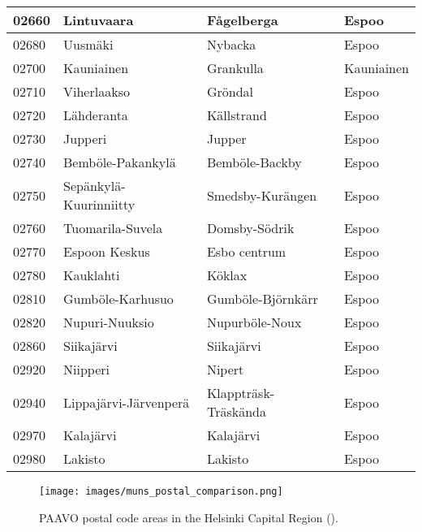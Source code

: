 \begin{longtable}{llll}
    02660 & Lintuvaara & Fågelberga & Espoo \\ [0.25ex] \hline
    02680 & Uusmäki & Nybacka & Espoo \\ [0.25ex] \hline
    02700 & Kauniainen & Grankulla & Kauniainen \\ [0.25ex] \hline
    02710 & Viherlaakso & Gröndal & Espoo \\ [0.25ex] \hline
    02720 & Lähderanta & Källstrand & Espoo \\ [0.25ex] \hline
    02730 & Jupperi & Jupper & Espoo \\ [0.25ex] \hline
    02740 & Bemböle-Pakankylä & Bemböle-Backby & Espoo \\ [0.25ex] \hline
    02750 & Sepänkylä-Kuurinniitty & Smedsby-Kurängen & Espoo \\ [0.25ex] \hline
    02760 & Tuomarila-Suvela & Domsby-Södrik & Espoo \\ [0.25ex] \hline
    02770 & Espoon Keskus & Esbo centrum & Espoo \\ [0.25ex] \hline
    02780 & Kauklahti & Köklax & Espoo \\ [0.25ex] \hline
    02810 & Gumböle-Karhusuo & Gumböle-Björnkärr & Espoo \\ [0.25ex] \hline
    02820 & Nupuri-Nuuksio & Nupurböle-Noux & Espoo \\ [0.25ex] \hline
    02860 & Siikajärvi & Siikajärvi & Espoo \\ [0.25ex] \hline
    02920 & Niipperi & Nipert & Espoo \\ [0.25ex] \hline
    02940 & Lippajärvi-Järvenperä & Klappträsk-Träskända & Espoo \\ [0.25ex] \hline
    02970 & Kalajärvi & Kalajärvi & Espoo \\ [0.25ex] \hline
    02980 & Lakisto & Lakisto & Espoo \\ [0.75ex] \hline
\end{longtable}

\begin{sidewaysfigure}
    \texttt{[image: images/muns\_postal\_comparison.png]}
    \caption[PAAVO postal code areas in the Helsinki Capital Region]{PAAVO postal code areas in the Helsinki Capital Region (\cite{OpenStreetMap}).}
    \label{fig:appendix_muns_postal}
\end{sidewaysfigure}
\restoregeometry